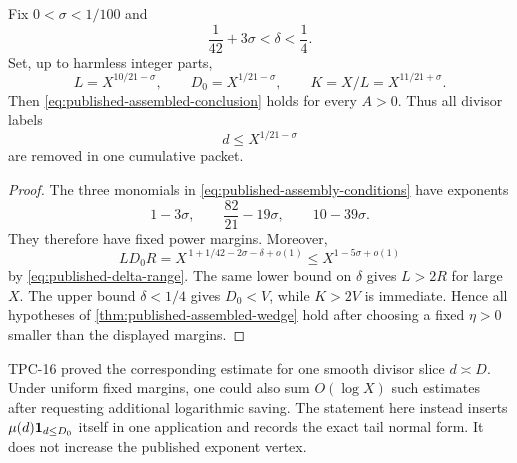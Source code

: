 \begin{corollary}
\label{cor:published-explicit-prefix}
Fix $0<\sigma<1/100$ and
\begin{equation}
 \frac1{42}+3\sigma<\delta<\frac14.
 \label{eq:published-delta-range}
\end{equation}
Set, up to harmless integer parts,
\begin{equation}
 L=X^{10/21-\sigma},
 \qquad
 D_0=X^{1/21-\sigma},
 \qquad
 K=X/L=X^{11/21+\sigma}.
 \label{eq:published-explicit-scales}
\end{equation}
Then \eqref{eq:published-assembled-conclusion} holds for every $A>0$.
Thus all divisor labels
\begin{equation}
 d\le X^{1/21-\sigma}
 \label{eq:published-prefix-length}
\end{equation}
are removed in one cumulative packet.
\end{corollary}

\begin{proof}
The three monomials in
\eqref{eq:published-assembly-conditions} have exponents
\begin{equation}
 1-3\sigma,
 \qquad
 \frac{82}{21}-19\sigma,
 \qquad
 10-39\sigma.
 \label{eq:published-monomial-check}
\end{equation}
They therefore have fixed power margins.  Moreover,
\begin{equation}
 LD_0R
 =X^{\,1+1/42-2\sigma-\delta+o(1)}
 \le X^{1-5\sigma+o(1)}
 \label{eq:published-leakage-check}
\end{equation}
by \eqref{eq:published-delta-range}.  The same lower bound on $\delta$
gives $L>2R$ for large $X$.  The upper bound $\delta<1/4$ gives
$D_0<V$, while $K>2V$ is immediate.  Hence all hypotheses of
\cref{thm:published-assembled-wedge} hold after choosing a fixed
$\eta>0$ smaller than the displayed margins.
\end{proof}

\begin{remark}
TPC-16 proved the corresponding estimate for one smooth divisor slice
$d\asymp D$.  Under uniform fixed margins, one could also sum
$O(\log X)$ such estimates after requesting additional logarithmic
saving.  The statement here instead inserts
$\mu(d)\mathbf 1_{d\le D_0}$ itself in one application and records the exact
tail normal form.  It does not increase the published exponent vertex.
\end{remark}
